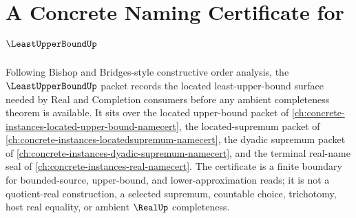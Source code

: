 \chapter{A Concrete Naming Certificate for $\LeastUpperBoundUp$}
\label{ch:concrete-instances-least-upper-bound-namecert}

Following Bishop and Bridges-style constructive order analysis, the $\LeastUpperBoundUp$ packet records the located least-upper-bound surface needed by Real and Completion consumers before any ambient completeness theorem is available. It sits over the located upper-bound packet of \autoref{ch:concrete-instances-located-upper-bound-namecert}, the located-supremum packet of \autoref{ch:concrete-instances-locatedsupremum-namecert}, the dyadic supremum packet of \autoref{ch:concrete-instances-dyadic-supremum-namecert}, and the terminal real-name seal of \autoref{ch:concrete-instances-real-namecert}. The certificate is a finite boundary for bounded-source, upper-bound, and lower-approximation reads; it is not a quotient-real construction, a selected supremum, countable choice, trichotomy, host real equality, or ambient $\RealUp$ completeness.

